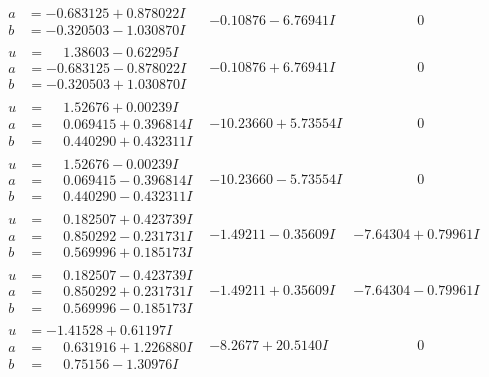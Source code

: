 \documentclass[1p]{elsarticle_modified}
\theoremstyle{definition}
\begin{document}
$$\begin{array}{c|c|c}
\begin{aligned}
a &= -0.683125 + 0.878022 I \\
b &= -0.320503 - 1.030870 I\end{aligned}
 & -0.10876 - 6.76941 I & \phantom{-0.000000 } 0 \\ \hline\begin{aligned}
u &= \phantom{-}1.38603 - 0.62295 I \\
a &= -0.683125 - 0.878022 I \\
b &= -0.320503 + 1.030870 I\end{aligned}
 & -0.10876 + 6.76941 I & \phantom{-0.000000 } 0 \\ \hline\begin{aligned}
u &= \phantom{-}1.52676 + 0.00239 I \\
a &= \phantom{-}0.069415 + 0.396814 I \\
b &= \phantom{-}0.440290 + 0.432311 I\end{aligned}
 & -10.23660 + 5.73554 I & \phantom{-0.000000 } 0 \\ \hline\begin{aligned}
u &= \phantom{-}1.52676 - 0.00239 I \\
a &= \phantom{-}0.069415 - 0.396814 I \\
b &= \phantom{-}0.440290 - 0.432311 I\end{aligned}
 & -10.23660 - 5.73554 I & \phantom{-0.000000 } 0 \\ \hline\begin{aligned}
u &= \phantom{-}0.182507 + 0.423739 I \\
a &= \phantom{-}0.850292 - 0.231731 I \\
b &= \phantom{-}0.569996 + 0.185173 I\end{aligned}
 & -1.49211 - 0.35609 I & -7.64304 + 0.79961 I \\ \hline\begin{aligned}
u &= \phantom{-}0.182507 - 0.423739 I \\
a &= \phantom{-}0.850292 + 0.231731 I \\
b &= \phantom{-}0.569996 - 0.185173 I\end{aligned}
 & -1.49211 + 0.35609 I & -7.64304 - 0.79961 I \\ \hline\begin{aligned}
u &= -1.41528 + 0.61197 I \\
a &= \phantom{-}0.631916 + 1.226880 I \\
b &= \phantom{-}0.75156 - 1.30976 I\end{aligned}
 & -8.2677 + 20.5140 I & \phantom{-0.000000 } 0 \\ \hline\begin{aligned}

\end{aligned}
\end{array}$$
\end{document}
